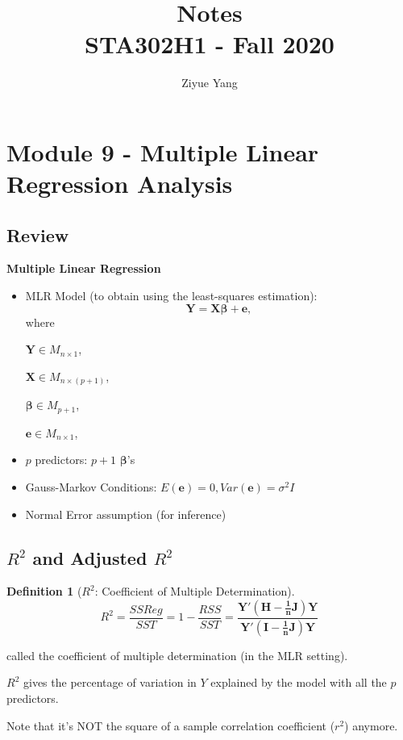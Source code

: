 \documentclass[11pt]{article}
\title{Notes\\
  {\large STA302H1 - Fall 2020}}
\author{Ziyue Yang}
\newenvironment{indentone}{\begin{adjustwidth}{3em}{0em}}{\end{adjustwidth}}
\newcommand\VEC{\bm}{}
\theoremstyle{definition}
\newtheorem{definition}{Definition}[section]
\numberwithin{equation}{section}
\begin{document}
\maketitle

\tableofcontents

\newpage

\section{Module 9 - Multiple Linear Regression Analysis}
\subsection{Review}
\textbf{Multiple Linear Regression}
\begin{itemize}
\item MLR Model (to obtain using the least-squares estimation):
\begin{equation}
  \VEC{Y} = \VEC{X\beta} + \VEC{e},
\end{equation}
where
\begin{indentone}
$\VEC{Y}\in M_{n\times 1}$, 

$\VEC{X}\in M_{n\times(p+1)}$,

$\VEC{\beta}\in M_{p+1}$,

$\VEC{e}\in M_{n\times 1}$,

\end{indentone}

\item $p$ predictors: $p+1$ $\VEC{\beta}$'s
\item Gauss-Markov Conditions: $E(\VEC{e})=0, Var(\VEC{e})=\sigma^2 I$
\item Normal Error assumption (for inference)
\end{itemize}

\subsection{$R^2$ and Adjusted $R^2$}

\begin{definition}[$R^2$: Coefficient of Multiple Determination]
  \begin{equation}
  R^2=\frac{SSReg}{SST}=1-\frac{RSS}{SST} = \frac{\VEC{Y'(H-\frac{1}{n} J)Y}}{\VEC{Y'(I-\frac{1}{n}J)Y}}
  \end{equation}

  called the coefficient of multiple determination (in the MLR setting).

  $R^2$ gives the percentage of variation in $Y$ explained by the model with all the $p$ predictors.
\end{definition}
\begin{writenotes}
  Note that it's NOT the square of a sample correlation coefficient ($r^2$) anymore.
\end{writenotes}
\end{document}
